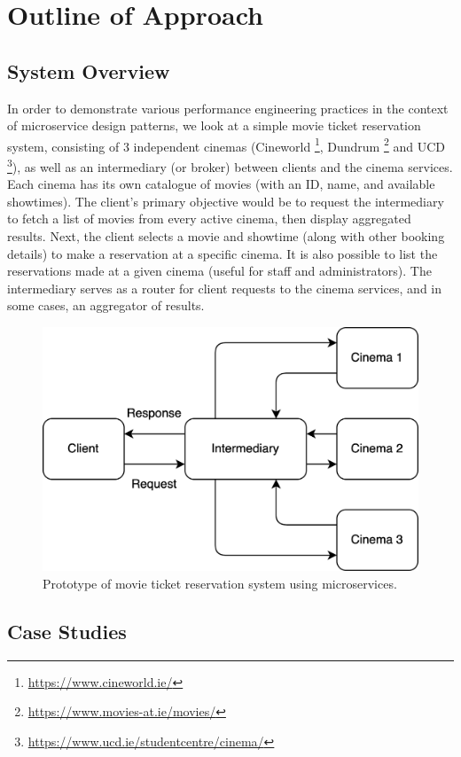 \chapter{Outline of Approach}

\section{System Overview}

In order to demonstrate various performance engineering practices in the context of microservice design patterns, we look at a simple movie ticket reservation system, consisting of 3 independent cinemas (Cineworld \footnote{\url{https://www.cineworld.ie/}}, Dundrum \footnote{\url{https://www.movies-at.ie/movies/}} and UCD \footnote{\url{https://www.ucd.ie/studentcentre/cinema/}}), as well as an intermediary (or broker) between clients and the cinema services. Each cinema has its own catalogue of movies (with an ID, name, and available showtimes). The client's primary objective would be to request the intermediary to fetch a list of movies from every active cinema, then display aggregated results. Next, the client selects a movie and showtime (along with other booking details) to make a reservation at a specific cinema. It is also possible to list the reservations made at a given cinema (useful for staff and administrators). The intermediary serves as a router for client requests to the cinema services, and in some cases, an aggregator of results.


\begin{figure}[H]
  \centering
  \includegraphics[width=0.5\linewidth]{./assets/diagrams/outline-arch.png}
  \caption{Prototype of movie ticket reservation system using microservices.}
  \label{fig:outline-arch}
\end{figure}

\section{Case Studies}


